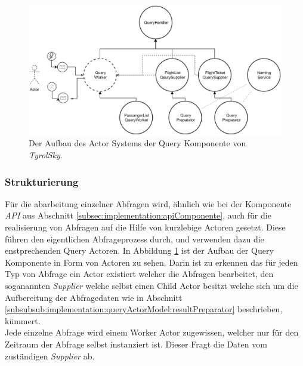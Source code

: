\begin{figure}
    \centering
    \includegraphics[width=\linewidth]{gfx/implementation/QueringServiceActorModel}
    \caption{Der Aufbau des Actor Systems der Query Komponente von \textit{TyrolSky}.}
    \label{fig:implementation:queryActorModel}
\end{figure} 

\subsubsection{Strukturierung}
Für die abarbeitung einzelner Abfragen wird, ähnlich wie bei der Komponente \textit{API} aus Abschnitt \ref{subsec:implementation:apiComponente}, auch für die realisierung von Abfragen auf die Hilfe von kurzlebige Actoren gesetzt. Diese führen den eigentlichen Abfrageprozess durch, und verwenden dazu die enstprechenden Query Actoren. In Abbildung \ref{fig:implementation:queryActorModel} ist der Aufbau der Query Komponente in Form von Actoren zu sehen. Darin ist zu erkennen das für jeden Typ von Abfrage ein Actor existiert welcher die Abfragen bearbeitet, den soganannten \textit{Supplier} welche selbst einen Child Actor besitzt welche sich um die Aufbereitung der Abfragedaten wie in Abschnitt \ref{subsubsub:implementation:queryActorModel:resultPreparator} beschrieben, kümmert. \\
Jede einzelne Abfrage wird einem Worker Actor zugewissen, welcher nur für den Zeitraum der Abfrage selbst instanziert ist. Dieser Fragt die Daten vom zuständigen \textit{Supplier} ab. 







